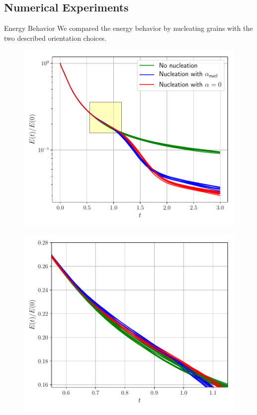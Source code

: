 \documentclass[usenames,dvipsnames]{beamer}
\begin{document}
\subsection{Numerical Experiments}

\begin{frame}{Energy Behavior}
We compared the energy behavior by nucleating grains with the two described orientation choices.
\begin{minipage}{0.5\textwidth}
\vspace{1em}
\begin{figure}
    \centering
    \includegraphics[scale=0.4]{figures/stored_energy/SE_energy.pdf}
\end{figure}
\end{minipage}%
\begin{minipage}{0.5\textwidth}
\vspace{1em}
\begin{figure}
    \centering
    \includegraphics[scale=0.4]{figures/stored_energy/SE_energy_zoom.pdf}
\end{figure}
\end{minipage}
\end{frame}
\end{document}
